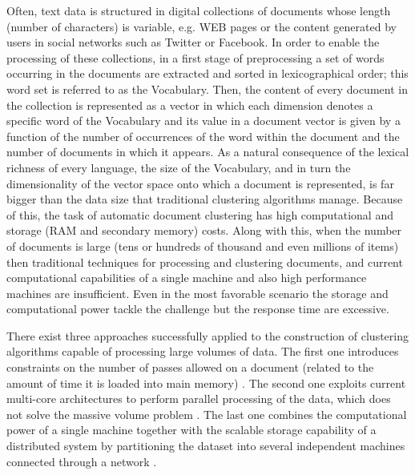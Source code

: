 \documentclass[a4paper]{article}
\begin{document}
Often, text data is structured in digital collections of documents whose length (number of characters) is variable, e.g. WEB pages or the content generated by users in social networks such as Twitter or Facebook. In order to enable the processing of these collections, in a first stage of preprocessing a set of words occurring in the documents are extracted and sorted in lexicographical order; this word set is referred to as the Vocabulary. Then, the content of every document in the collection is represented as a vector in which each dimension denotes a specific word of the Vocabulary and its value in a document vector is given by a function of the number of occurrences of the word within the document and the number of documents in which it appears. As a natural consequence of the lexical richness of every language, the size of the Vocabulary, and in turn the dimensionality of the vector space onto which a document is represented,  is far bigger than the data size that traditional clustering algorithms manage. Because of this, the task of automatic document clustering has high computational and storage (RAM and secondary memory) costs. Along with this, when the number of documents is large (tens or hundreds of thousand and even millions of items) then traditional techniques for processing and clustering documents, and current computational capabilities of a single machine and also high performance machines are insufficient. Even in the most favorable scenario the storage and computational power tackle the challenge but the response time are excessive.


There exist three approaches successfully applied to the construction of clustering algorithms capable of processing large volumes of data. The first one introduces constraints on the number of passes allowed on a document (related to the amount of time it is loaded into main memory) \cite{Yi14, I14}. The second one exploits current multi-core architectures to perform parallel processing of the data, which does not solve the massive volume problem \cite{ZW13}. The last one combines the computational power of a single machine together with the scalable storage capability of a distributed system by partitioning the dataset into several independent machines connected through a network \cite{SC16}.
\end{document}

